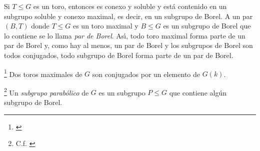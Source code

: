 Si $T\leq G$ es un toro, entonces es conexo y
soluble y est\'{a} contenido en un subgrupo soluble y conexo maximal, es decir,
en un subgrupo de Borel. A un par $(B,T)$ donde $T\leq G$ es un toro maximal y
$B\leq G$ es un subgrupo de Borel que lo contiene se lo llama \emph{par de %
Borel}. As\'{\i}, todo toro maximal forma parte de un par de Borel y, como hay
al menos, un par de Borel y los subgrupos de Borel son todos conjugados, todo
subgrupo de Borel forma parte de un par de Borel.

\begin{teoTorosConjugados}\label{thm:torosconjugados}
	\footnote{
		\cite[Theorem~17.10]{MilneAlgebraicGroups}
	}
	Dos toros maximales de $G$ son conjugados por un elemento de $G(k)$.
\end{teoTorosConjugados}

% 
% 
% 
% 
\begin{defParabolico}\label{def:parabolico}
	\footnote{
		C.f. \cite[Theorem~17.16]{MilneAlgebraicGroups}
	}
	Un \emph{subgrupo parab\'{o}lico} de $G$ es un subgrupo $P\leq G$ que
	contiene alg\'{u}n subgrupo de Borel.
\end{defParabolico}

